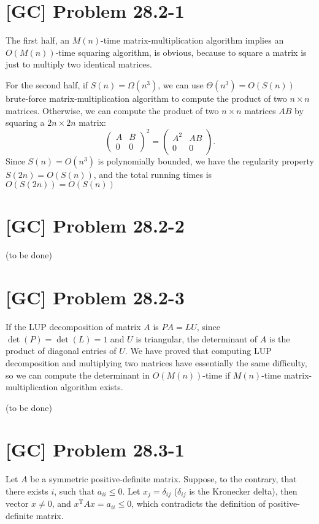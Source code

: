 \documentclass[a4paper,11pt]{article}
\begin{document}
  \section{[GC] Problem 28.2-1}
  The first half, an $M(n)$-time matrix-multiplication algorithm implies an $O(M(n))$-time squaring algorithm, is obvious, because to square a matrix is just to multiply two identical matrices. \par
  For the second half, if $S(n) = \Omega(n^3)$, we can use $\Theta(n^3) = O(S(n))$ brute-force matrix-multiplication algorithm to compute the product of two $n \times n$ matrices. Otherwise, we can compute the product of two $n \times n$ matrices $AB$ by squaring a $2n \times 2n$ matrix:
  $$ \begin{pmatrix} A & B \\ 0 & 0 \end{pmatrix}^2
     =
     \begin{pmatrix} A^2 & AB \\ 0 & 0 \end{pmatrix}. $$
  Since $S(n) = O(n^3)$ is polynomially bounded, we have the regularity property $S(2n) = O(S(n))$, and the total running times is $O(S(2n)) = O(S(n))$

  \section{[GC] Problem 28.2-2}
  (to be done)

  \section{[GC] Problem 28.2-3}
  If the LUP decomposition of matrix $A$ is $PA = LU$, since $\det(P) = \det(L) = 1$ and $U$ is triangular, the determinant of $A$ is the product of diagonal entries of $U$. We have proved that computing LUP decomposition and multiplying two matrices have essentially the same difficulty, so we can compute the determinant in $O(M(n))$-time if $M(n)$-time matrix-multiplication algorithm exists. \par
  (to be done)

  \section{[GC] Problem 28.3-1}
  Let $A$ be a symmetric positive-definite matrix. Suppose, to the contrary, that there exists $i$, such that $a_{ii} \leq 0$. Let $x_j = \delta_{ij}$ ($\delta_{ij}$ is the Kronecker delta), then vector $x \neq 0$, and $x^{\text{T}}Ax = a_{ii} \leq 0$, which contradicts the definition of positive-definite matrix.
\end{document}
